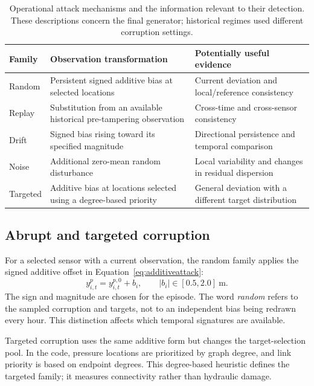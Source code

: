\begin{table}[tbp]
\centering\small
\caption[Operational attack mechanisms and the information relevant to their detection]{Operational attack mechanisms and the information relevant to their detection. These descriptions concern the final generator; historical regimes used different corruption settings.}
\label{tab:families}
\begin{tabularx}{\linewidth}{@{}lYY@{}}
\toprule
Family & Observation transformation & Potentially useful evidence\\
\midrule
Random & Persistent signed additive bias at selected locations & Current deviation and local/reference consistency\\
Replay & Substitution from an available historical pre-tampering observation & Cross-time and cross-sensor consistency\\
Drift & Signed bias rising toward its specified magnitude & Directional persistence and temporal comparison\\
Noise & Additional zero-mean random disturbance & Local variability and changes in residual dispersion\\
Targeted & Additive bias at locations selected using a degree-based priority & General deviation with a different target distribution\\
\bottomrule
\end{tabularx}
\end{table}

\subsection{Abrupt and targeted corruption}
For a selected sensor with a current observation, the random family applies the signed additive offset in Equation~\eqref{eq:additiveattack}:
\begin{equation}
 y^p_{i,t}=y^{p,0}_{i,t}+b_i,
 \qquad |b_i|\in[0.5,2.0]\ \mathrm{m}.\label{eq:additiveattack}
\end{equation}
The sign and magnitude are chosen for the episode. The word \emph{random} refers to the sampled corruption and targets, not to an independent bias being redrawn every hour. This distinction affects which temporal signatures are available.

Targeted corruption uses the same additive form but changes the target-selection pool. In the code, pressure locations are prioritized by graph degree, and link priority is based on endpoint degrees. This degree-based heuristic defines the targeted family; it measures connectivity rather than hydraulic damage.

